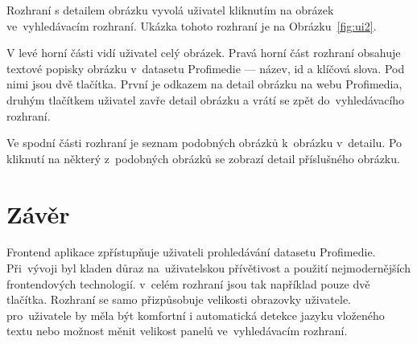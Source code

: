 Rozhraní s detailem obrázku vyvolá uživatel kliknutím na obrázek ve~vyhledávacím rozhraní. Ukázka tohoto rozhraní je na Obrázku~\ref{fig:ui2}.

V levé horní části vidí uživatel celý obrázek. Pravá horní část rozhraní obsahuje textové popisky obrázku v~datasetu Profimedie --- název, id a klíčová slova. Pod nimi jsou dvě tlačítka. První je odkazem na detail obrázku na webu Profimedia, druhým tlačítkem uživatel zavře detail obrázku a vrátí se zpět do~vyhledávacího rozhraní.

Ve spodní části rozhraní je seznam podobných obrázků k~obrázku v~detailu. Po kliknutí na některý z~podobných obrázků se zobrazí detail příslušného obrázku.

\section{Závěr}

Frontend aplikace zpřístupňuje uživateli prohledávání datasetu Profimedie. Při~vývoji byl kladen důraz na~uživatelskou přívětivost a použití nejmodernějších frontendových technologií. v~celém rozhraní jsou tak například pouze dvě tlačítka. Rozhraní se samo přizpůsobuje velikosti obrazovky uživatele. pro~uživatele by měla být komfortní i automatická detekce jazyku vloženého textu nebo možnost měnit velikost panelů ve~vyhledávacím rozhraní.




